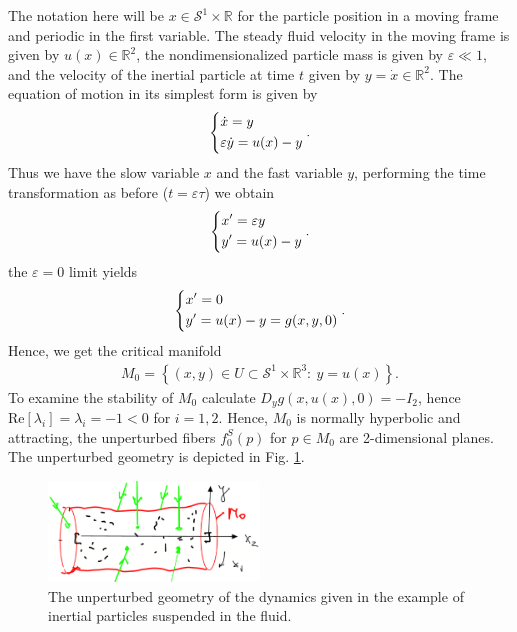 \begin{ex}
The notation here will be $x\in \mathcal{S}^{1}\times \mathbb{R}$ for the particle position in a moving frame and periodic in the first variable. The steady fluid velocity in the moving frame is given by $u(x) \in \mathbb{R}^{2}$, the nondimensionalized particle mass is given by $\varepsilon \ll 1$, and the velocity of the inertial particle at time $t$ given by $y=\dot{x}\in \mathbb{R}^{2}$. The equation of motion in its simplest form is given by \cite{Maxey1983}
\begin{align}
	\begin{dcases}
		\dot{x}=y\\
		\varepsilon \dot{y} = u(x) - y
	\end{dcases}
	.
\end{align}
Thus we have the slow variable $x$ and the fast variable $y$, performing the time transformation as before ($t = \varepsilon \tau$) we obtain
\begin{align}
\begin{dcases}
	x' = \varepsilon y \\
	y' = u(x) - y
\end{dcases}
.	
\end{align}
the $\varepsilon=0$ limit yields
\begin{align}
	\begin{dcases}
		x' = 0 \\
		y' = u(x) - y = g(x,y,0)
	\end{dcases}
	.
\end{align}
Hence, we get the critical manifold
\begin{align}
	M_0 = \left\{ (x,y)\in U \subset \mathcal{S}^{1}\times \mathbb{R}^{3}:\ y = u(x)\right\}.
\end{align}
To examine the stability of $M_0$ calculate $D_{y}g(x, u(x), 0) = - I_{2}$, hence $ \textrm{Re} [\lambda_i]= \lambda_i =-1<0$ for $i=1,2$. Hence, $M_0$ is normally hyperbolic and attracting, the unperturbed fibers $f_{0}^{S}(p)$ for $p\in M_0$ are 2-dimensional planes. The unperturbed geometry is depicted in Fig. \ref{fig:unperturbed_fluid_geometry}.
\begin{figure}[h!]
	\centering
	\includegraphics[width=0.5\textwidth]{figures/ch9/21unperturbed_fluid_geometry.png}
	\caption{The unperturbed geometry of the dynamics given in the example of inertial particles suspended in the fluid.}
	\label{fig:unperturbed_fluid_geometry}
\end{figure}


\end{ex}
